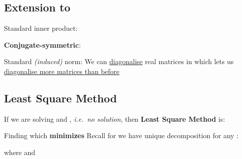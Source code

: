 \subsection*{\texorpdfstring{Extension to
            }{Extension to }}

\begin{itemize}

      \vItem
            Standard inner product:

            \begin{itemize}

                  \vItem
                        \textbf{Conjugate-symmetric}:
            \end{itemize}
      \vItem
            Standard \emph{(induced)} norm:
      \vItem
            We can \underline{diagonalise} real matrices in
             which lets us \underline{diagonalise more matrices than before}
\end{itemize}

\subsection*{Least Square Method}


If we are solving  and
, \emph{i.e.~no solution},
then \textbf{Least Square Method} is:

\begin{itemize}

      \vItem
            Finding  which \textbf{minimizes}
      \vItem
            Recall for  we have unique decomposition for
            any :

            \begin{itemize}

                  \vItem
                        where  and
            \end{itemize}
      \vItem
\end{itemize}

